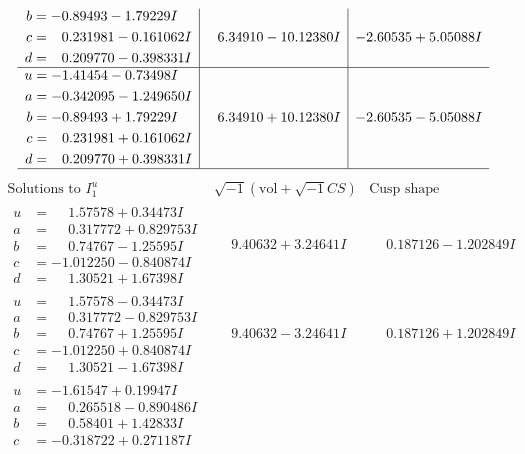 \documentclass[1p]{elsarticle_modified}
\theoremstyle{definition}
\newcommand{\I}{\sqrt{-1}}
\begin{document}
$$\begin{array}{c|c|c}
\begin{aligned}
b &= -0.89493 - 1.79229 I \\
c &= \phantom{-}0.231981 - 0.161062 I \\
d &= \phantom{-}0.209770 - 0.398331 I\end{aligned}
 & \phantom{-}6.34910 - 10.12380 I & -2.60535 + 5.05088 I \\ \hline\begin{aligned}
u &= -1.41454 - 0.73498 I \\
a &= -0.342095 - 1.249650 I \\
b &= -0.89493 + 1.79229 I \\
c &= \phantom{-}0.231981 + 0.161062 I \\
d &= \phantom{-}0.209770 + 0.398331 I\end{aligned}
 & \phantom{-}6.34910 + 10.12380 I & -2.60535 - 5.05088 I\\
 \hline 
 \end{array}$$\newpage$$\begin{array}{c|c|c}  
\text{Solutions to }I^u_{1}& \I (\text{vol} + \sqrt{-1}CS) & \text{Cusp shape}\\
 \hline 
\begin{aligned}
u &= \phantom{-}1.57578 + 0.34473 I \\
a &= \phantom{-}0.317772 + 0.829753 I \\
b &= \phantom{-}0.74767 - 1.25595 I \\
c &= -1.012250 - 0.840874 I \\
d &= \phantom{-}1.30521 + 1.67398 I\end{aligned}
 & \phantom{-}9.40632 + 3.24641 I & \phantom{-}0.187126 - 1.202849 I \\ \hline\begin{aligned}
u &= \phantom{-}1.57578 - 0.34473 I \\
a &= \phantom{-}0.317772 - 0.829753 I \\
b &= \phantom{-}0.74767 + 1.25595 I \\
c &= -1.012250 + 0.840874 I \\
d &= \phantom{-}1.30521 - 1.67398 I\end{aligned}
 & \phantom{-}9.40632 - 3.24641 I & \phantom{-}0.187126 + 1.202849 I \\ \hline\begin{aligned}
u &= -1.61547 + 0.19947 I \\
a &= \phantom{-}0.265518 - 0.890486 I \\
b &= \phantom{-}0.58401 + 1.42833 I \\
c &= -0.318722 + 0.271187 I \\

\end{aligned}
\end{array}$$
\end{document}
